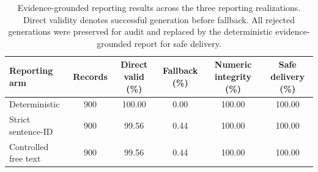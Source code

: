 
\begin{table}[t]
\centering
\caption{Evidence-grounded reporting results across the three reporting
realizations. Direct validity denotes successful generation before fallback.
All rejected generations were preserved for audit and replaced by the
deterministic evidence-grounded report for safe delivery.}
\label{tab:reporting_arms}
\begin{tabular}{lccccc}
\toprule
Reporting arm &
Records &
Direct valid (\%) &
Fallback (\%) &
Numeric integrity (\%) &
Safe delivery (\%) \\
\midrule
Deterministic & 900 & 100.00 & 0.00 & 100.00 & 100.00 \\
Strict sentence-ID & 900 & 99.56 & 0.44 & 100.00 & 100.00 \\
Controlled free text & 900 & 99.56 & 0.44 & 100.00 & 100.00 \\
\bottomrule
\end{tabular}
\end{table}
